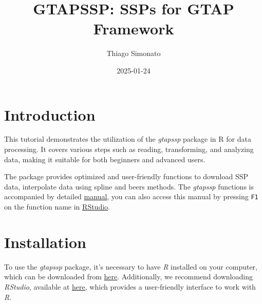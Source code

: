 \documentclass[
  letterpaper,
  DIV=11,
  numbers=noendperiod]{scrartcl}
\title{GTAPSSP: SSPs for GTAP Framework}
\author{Thiago Simonato}
\date{2025-01-24}
\renewcommand*\contentsname{Table of contents}
\newcommand\contentsname{Table of contents}
\begin{document}
\maketitle

\renewcommand*\contentsname{Table of contents}
{
\hypersetup{linkcolor=}
\setcounter{tocdepth}{6}
\tableofcontents
}

\section{Introduction}\label{introduction}

This tutorial demonstrates the utilization of the \emph{gtapssp} package
in R for data processing. It covers various steps such as reading,
transforming, and analyzing data, making it suitable for both beginners
and advanced users.

The package provides optimized and user-friendly functions to download
SSP data, interpolate data using spline and beers methods. The
\emph{gtapssp} functions is accompanied by detailed
\href{https://github.com/tsimonato/gtapssp/raw/master/docs/gtapssp_0.0.0.9000.pdf}{manual},
you can also access this manual by pressing \texttt{F1} on the function
name in \href{https://posit.co/download/rstudio-desktop/}{RStudio}.

\section{Installation}\label{installation}

To use the \emph{gtapssp} package, it's necessary to have \emph{R}
installed on your computer, which can be downloaded from
\href{https://www.r-project.org/}{here}. Additionally, we recommend
downloading \emph{RStudio}, available at
\href{https://posit.co/download/rstudio-desktop/}{here}, which provides
a user-friendly interface to work with \emph{R}.
\end{document}
